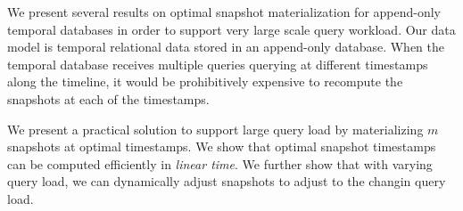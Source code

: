 We present several results on optimal snapshot materialization
for append-only temporal databases in order to support very large
scale query workload.  Our data model is temporal relational data
stored in an append-only database. When the temporal database receives
multiple queries querying at different timestamps along the timeline, it
would be prohibitively expensive to recompute the snapshots at each
of the timestamps.

We present a practical solution to support large query load
by materializing $m$ snapshots at optimal timestamps.  We show that optimal
snapshot timestamps can be computed efficiently in {\em linear time}.
We further show that with varying query load, we can dynamically adjust
snapshots to adjust to the changin query load.

